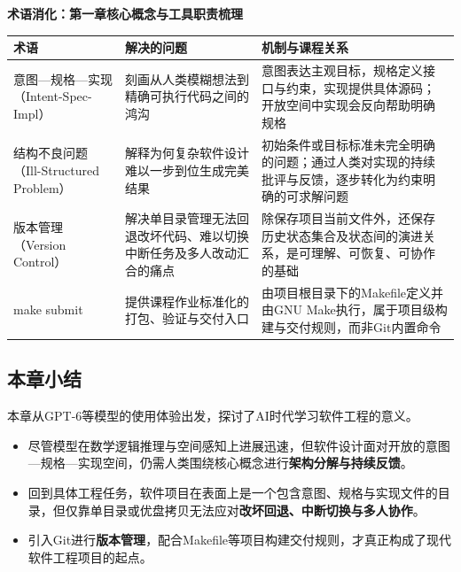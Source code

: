 \documentclass[UTF8,a4paper,11pt,fontset=fandol]{ctexart}
\begin{document}
\par{}\textbf{术语消化：第一章核心概念与工具职责梳理}

\begin{center}\small\begin{tabularx}{\linewidth}{YYY}

\toprule

术语 & 解决的问题 & 机制与课程关系\\\midrule

意图—规格—实现（Intent-Spec-Impl） & 刻画从人类模糊想法到精确可执行代码之间的鸿沟 & 意图表达主观目标，规格定义接口与约束，实现提供具体源码；开放空间中实现会反向帮助明确规格\\[3pt]

结构不良问题（Ill-Structured Problem） & 解释为何复杂软件设计难以一步到位生成完美结果 & 初始条件或目标标准未完全明确的问题；通过人类对实现的持续批评与反馈，逐步转化为约束明确的可求解问题\\[3pt]

版本管理（Version Control） & 解决单目录管理无法回退改坏代码、难以切换中断任务及多人改动汇合的痛点 & 除保存项目当前文件外，还保存历史状态集合及状态间的演进关系，是可理解、可恢复、可协作的基础\\[3pt]

make submit & 提供课程作业标准化的打包、验证与交付入口 & 由项目根目录下的Makefile定义并由GNU Make执行，属于项目级构建与交付规则，而非Git内置命令\\[3pt]

\bottomrule\end{tabularx}\end{center}

\subsection{本章小结}

本章从GPT-6等模型的使用体验出发，探讨了AI时代学习软件工程的意义。

\begin{itemize}
\item 尽管模型在数学逻辑推理与空间感知上进展迅速，但软件设计面对开放的意图—规格—实现空间，仍需人类围绕核心概念进行\textbf{架构分解与持续反馈}。

\item 回到具体工程任务，软件项目在表面上是一个包含意图、规格与实现文件的目录，但仅靠单目录或优盘拷贝无法应对\textbf{改坏回退、中断切换与多人协作}。

\item 引入Git进行\textbf{版本管理}，配合Makefile等项目构建交付规则，才真正构成了现代软件工程项目的起点。
\end{itemize}
\end{document}
